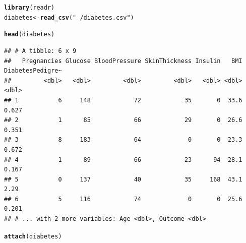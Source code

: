 \documentclass{article}\usepackage[]{graphicx}\usepackage[]{color}
\makeatletter
\newcommand{\hlstr}[1]{\textcolor[rgb]{0.192,0.494,0.8}{#1}}%
\newcommand{\hlstd}[1]{\textcolor[rgb]{0.345,0.345,0.345}{#1}}%
\newcommand{\hlkwb}[1]{\textcolor[rgb]{0.69,0.353,0.396}{#1}}%
\newcommand{\hlkwd}[1]{\textcolor[rgb]{0.737,0.353,0.396}{\textbf{#1}}}%
\newenvironment{kframe}{%
 \def\at@end@of@kframe{}%
 \ifinner\ifhmode%
  \def\at@end@of@kframe{\end{minipage}}%
  \begin{minipage}{\columnwidth}%
 \fi\fi%
 \def\FrameCommand##1{\hskip\@totalleftmargin \hskip-\fboxsep
 \colorbox{shadecolor}{##1}\hskip-\fboxsep
     \hskip-\linewidth \hskip-\@totalleftmargin \hskip\columnwidth}%
 \MakeFramed {\advance\hsize-\width
   \@totalleftmargin\z@ \linewidth\hsize
   \@setminipage}}%
 {\par\unskip\endMakeFramed%
 \at@end@of@kframe}
\newenvironment{knitrout}{}{} %
\makeatother
\begin{document}
\begin{knitrout}
\color{fgcolor}\begin{kframe}
\begin{alltt}
\hlkwd{library}\hlstd{(readr)}
\hlstd{diabetes} \hlkwb{<-} \hlkwd{read_csv}\hlstd{(}\hlstr{"~/diabetes.csv"}\hlstd{)}
\end{alltt}


{\ttfamily\noindent\itshape\color{messagecolor}{\#\# \\\#\# -- Column specification --------------------------------------------------------\\\#\# cols(\\\#\# \ \ Pregnancies = col\_double(),\\\#\# \ \ Glucose = col\_double(),\\\#\# \ \ BloodPressure = col\_double(),\\\#\# \ \ SkinThickness = col\_double(),\\\#\# \ \ Insulin = col\_double(),\\\#\# \ \ BMI = col\_double(),\\\#\# \ \ DiabetesPedigreeFunction = col\_double(),\\\#\# \ \ Age = col\_double(),\\\#\# \ \ Outcome = col\_double()\\\#\# )}}\begin{alltt}
\hlkwd{head}\hlstd{(diabetes)}
\end{alltt}
\begin{verbatim}
## # A tibble: 6 x 9
##   Pregnancies Glucose BloodPressure SkinThickness Insulin   BMI DiabetesPedigre~
##         <dbl>   <dbl>         <dbl>         <dbl>   <dbl> <dbl>            <dbl>
## 1           6     148            72            35       0  33.6            0.627
## 2           1      85            66            29       0  26.6            0.351
## 3           8     183            64             0       0  23.3            0.672
## 4           1      89            66            23      94  28.1            0.167
## 5           0     137            40            35     168  43.1            2.29 
## 6           5     116            74             0       0  25.6            0.201
## # ... with 2 more variables: Age <dbl>, Outcome <dbl>
\end{verbatim}
\begin{alltt}
\hlkwd{attach}\hlstd{(diabetes)}
\end{alltt}
\end{kframe}
\end{knitrout}
\end{document}
